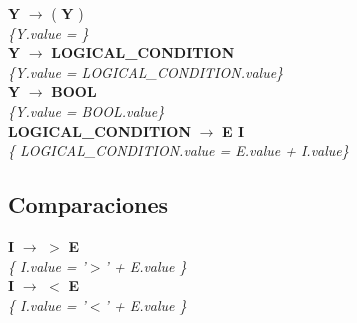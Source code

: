 \documentclass[10pt,a4paper]{article}
\begin{document}
\textbf{Y} $\rightarrow$ ( \textbf{Y} ) \\
\textit{\{Y.value = \}} \\

\textbf{Y} $\rightarrow$ \textbf{LOGICAL\_CONDITION}   \\
\textit{\{Y.value = LOGICAL\_CONDITION.value\}}\\

\textbf{Y} $\rightarrow$ \textbf{BOOL}   \\
\textit{\{Y.value = BOOL.value\}}\\


\textbf{LOGICAL\_CONDITION} $\rightarrow$ \textbf{E I} \\
\textit{\{ LOGICAL\_CONDITION.value = E.value + I.value\}} \\







\subsection{Comparaciones}
\textbf{I} $\rightarrow$ $>$ \textbf{E} \\
\textit{\{ I.value = '$>$' + E.value  \}} \\

\textbf{I} $\rightarrow$ $<$ \textbf{E}\\
\textit{\{ I.value = '$<$' + E.value  \}} \\
\end{document}
